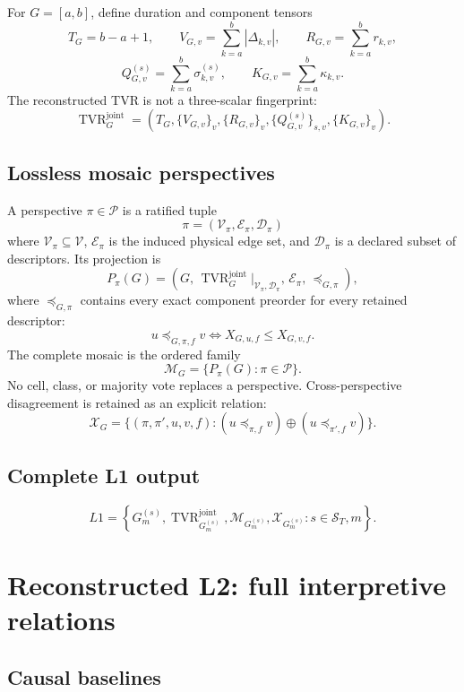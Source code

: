 \documentclass[11pt,oneside]{article}
\newcommand{\Vertices}{\mathcal{V}}
\newcommand{\Edges}{\mathcal{E}}
\newcommand{\Scales}{\mathcal{S}}
\newcommand{\Perspectives}{\mathcal{P}}
\begin{document}
For \(G=[a,b]\), define duration and component tensors
\[
  T_G=b-a+1,
  \qquad
  V_{G,v}=\sum_{k=a}^{b}|\Delta_{k,v}|,
  \qquad
  R_{G,v}=\sum_{k=a}^{b}r_{k,v},
\]
\[
  Q^{(s)}_{G,v}=\sum_{k=a}^{b}\sigma^{(s)}_{k,v},
  \qquad
  K_{G,v}=\sum_{k=a}^{b}\kappa_{k,v}.
\]
The reconstructed TVR is not a three-scalar fingerprint:
\[
  \operatorname{TVR}^{\mathrm{joint}}_G
  =
  \left(
    T_G,\{V_{G,v}\}_v,\{R_{G,v}\}_v,
    \{Q^{(s)}_{G,v}\}_{s,v},\{K_{G,v}\}_v
  \right).
\]

\subsection{Lossless mosaic perspectives}

A perspective \(\pi\in\Perspectives\) is a ratified tuple
\[
  \pi=(\Vertices_\pi,\Edges_\pi,\mathcal{D}_\pi)
\]
where \(\Vertices_\pi\subseteq\Vertices\),
\(\Edges_\pi\) is the induced physical edge set, and
\(\mathcal{D}_\pi\) is a declared subset of descriptors. Its projection is
\[
  P_\pi(G)=
  \left(
    G,\,
    \operatorname{TVR}^{\mathrm{joint}}_G
      \big|_{\Vertices_\pi,\mathcal{D}_\pi},\,
    \Edges_\pi,\,
    \preceq_{G,\pi}
  \right),
\]
where \(\preceq_{G,\pi}\) contains every exact component preorder for every
retained descriptor:
\[
  u\preceq_{G,\pi,f}v
  \iff X_{G,u,f}\leq X_{G,v,f}.
\]
The complete mosaic is the ordered family
\[
  \mathcal{M}_G=\{P_\pi(G):\pi\in\Perspectives\}.
\]
No cell, class, or majority vote replaces a perspective. Cross-perspective
disagreement is retained as an explicit relation:
\[
  \mathcal{X}_G=
  \{(\pi,\pi',u,v,f):
  (u\preceq_{\pi,f}v)\oplus(u\preceq_{\pi',f}v)\}.
\]

\subsection{Complete L1 output}

\[
  L1=
  \left\{
    G^{(s)}_m,\operatorname{TVR}^{\mathrm{joint}}_{G^{(s)}_m},
    \mathcal{M}_{G^{(s)}_m},\mathcal{X}_{G^{(s)}_m}
    :s\in\Scales_T,m
  \right\}.
\]

\section{Reconstructed L2: full interpretive relations}

\subsection{Causal baselines}
\end{document}
